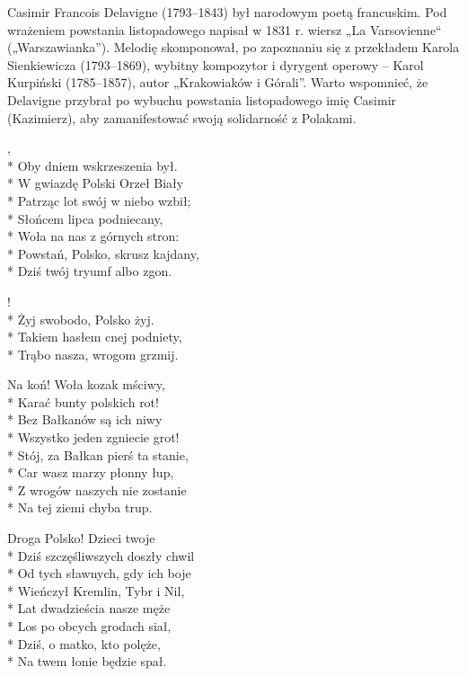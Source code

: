 \begin{info}Casimir Francois Delavigne (1793–1843) był narodowym poetą francuskim. Pod wrażeniem powstania listopadowego napisał w 1831 r. wiersz „La Varsovienne“ („Warszawianka”). Melodię skomponował, po zapoznaniu się z przekładem Karola Sienkiewicza (1793–1869), wybitny kompozytor i dyrygent operowy – Karol Kurpiński (1785–1857), autor „Krakowiaków i Górali”. Warto wspomnieć, że Delavigne przybrał po wybuchu powstania listopadowego imię Casimir (Kazimierz), aby zamanifestować swoją solidarność z Polakami.\end{info}

\begin{lyrics}[longestline={Niech krwią zlane w bojach srogich,}]

,\\*
Oby dniem wskrzeszenia był.\\*
W gwiazdę Polski Orzeł Biały\\*
Patrząc lot swój w niebo wzbił;\\*
Słońcem lipca podniecany,\\*
Woła na nas z górnych stron:\\*
Powstań, Polsko, skrusz kajdany,\\*
Dziś twój tryumf albo zgon.

\begin{chorus}
!\\*
Żyj swobodo, Polsko żyj.\\*
Takiem hasłem cnej podniety,\\*
Trąbo nasza, wrogom grzmij.
\end{chorus}

Na koń! Woła kozak mściwy,\\*
Karać bunty polskich rot!\\*
Bez Bałkanów są ich niwy\\*
Wszystko jeden zgniecie grot!\\*
Stój, za Bałkan pierś ta stanie,\\*
Car wasz marzy płonny łup,\\*
Z wrogów naszych nie zostanie\\*
Na tej ziemi chyba trup.

\chorusref

Droga Polsko! Dzieci twoje\\*
Dziś szczęśliwszych doszły chwil\\*
Od tych sławnych, gdy ich boje\\*
Wieńczył Kremlin, Tybr i Nil,\\*
Lat dwadzieścia nasze męże\\*
Los po obcych grodach siał,\\*
Dziś, o matko, kto polęże,\\*
Na twem łonie będzie spał.


\end{lyrics}
